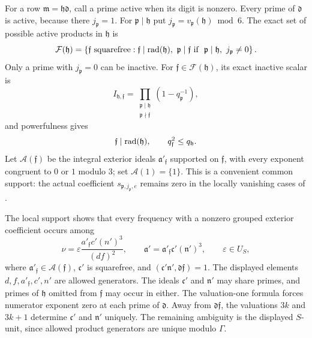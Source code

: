 For a row \(\mathfrak m=\mathfrak h\mathfrak d\), call a prime active
when its digit is nonzero.  Every prime of \(\mathfrak d\) is active,
because there \(j_{\mathfrak p}=1\).  For \(\mathfrak p\mid\mathfrak h\)
put \(j_{\mathfrak p}=v_{\mathfrak p}(\mathfrak h)\bmod6\).  The exact
set of possible active products in \(\mathfrak h\) is
\begin{equation}\label{eq:reflection-active-set}
 \mathcal F(\mathfrak h)=
 \left\{\mathfrak f\ \mathrm{squarefree}:
   \mathfrak f\mid\operatorname{rad}(\mathfrak h),\
   \mathfrak p\mid\mathfrak f\ \text{if }\
       \mathfrak p\mid\mathfrak h,\ j_{\mathfrak p}\ne0\right\}.
\end{equation}
Only a prime with \(j_{\mathfrak p}=0\) can be inactive.  For
\(\mathfrak f\in\mathcal F(\mathfrak h)\), its exact inactive scalar is
\[
 I_{\mathfrak h,\mathfrak f}
    =\prod_{\substack{\mathfrak p\mid\mathfrak h\\
                      \mathfrak p\nmid\mathfrak f}}
           (1-q_{\mathfrak p}^{-1}),
\]
and powerfulness gives
\begin{equation}\label{eq:reflection-active-norm}
 \mathfrak f\mid\operatorname{rad}(\mathfrak h),\qquad
 q_{\mathfrak f}^2\le q_{\mathfrak h}.
\end{equation}
Let \(\mathcal A(\mathfrak f)\) be the integral exterior ideals
\(\mathfrak a'_{\mathfrak f}\) supported on \(\mathfrak f\), with every
exponent congruent to \(0\) or \(1\) modulo \(3\); set
\(\mathcal A(1)=\{1\}\).  This is a convenient common support: the actual
coefficient \(s_{\mathfrak p,j_{\mathfrak p},e}\) remains zero in the
locally vanishing cases of \Cref{lem:reflection-local-Weyl}.

The local support shows that every frequency with a nonzero grouped
exterior coefficient occurs among
\begin{equation}\label{eq:reflection-frequency}
 \nu=\varepsilon\frac{a'_{\mathfrak f}c'(n')^3}{(df)^2},
 \qquad
 \mathfrak a'=\mathfrak a'_{\mathfrak f}\mathfrak c'(\mathfrak n')^3,
 \qquad \varepsilon\in U_S,
\end{equation}
where \(\mathfrak a'_{\mathfrak f}\in\mathcal A(\mathfrak f)\),
\(\mathfrak c'\) is squarefree, and
\((\mathfrak c'\mathfrak n',\mathfrak d\mathfrak f)=1\).
The displayed elements \(d,f,a'_{\mathfrak f},c',n'\) are allowed
generators.  The ideals \(\mathfrak c'\) and \(\mathfrak n'\) may share
primes, and primes of \(\mathfrak h\) omitted from \(\mathfrak f\) may
occur in either.  The valuation-one formula forces numerator exponent
zero at each prime of \(\mathfrak d\).  Away from
\(\mathfrak d\mathfrak f\), the valuations \(3k\) and \(3k+1\)
determine \(\mathfrak c'\) and \(\mathfrak n'\) uniquely.  The remaining
ambiguity is the displayed \(S\)-unit, since allowed product generators
are unique modulo \(\Gamma\).

